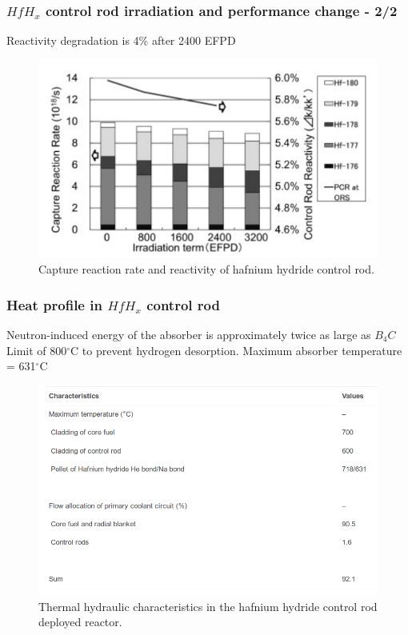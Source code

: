 \documentclass[9pt]{beamer}
\newcommand{\hfh}{$HfH_{x}$\xspace}
\newcommand{\bc}{$B_4C$\xspace}
\begin{document}
\begin{frame}
\frametitle{\hfh control rod irradiation and performance change - 2/2}
Reactivity degradation is 4\% after 2400 \gls{EFPD}
\begin{figure}[htbp!]
  \begin{center}
      \includegraphics[scale=0.5]{./images/irrad_reac.png}
  \end{center}
  \caption{Capture reaction rate and reactivity of hafnium hydride control rod.}
  \label{fig:irrad_reac}
\end{figure}
\end{frame}

\begin{frame}
\frametitle{Heat profile in \hfh  control rod}
Neutron-induced energy of the absorber is approximately twice as large as \bc
Limit of 800$^\circ$C to prevent hydrogen desorption.
Maximum absorber temperature = 631$^\circ$C
\begin{figure}[htbp!]
  \begin{center}
      \includegraphics[scale=0.28]{./images/th.png}
  \end{center}
  \caption{Thermal hydraulic characteristics in the hafnium hydride control rod deployed reactor.}
  \label{fig:th}
\end{figure}
\end{frame}
\end{document}
